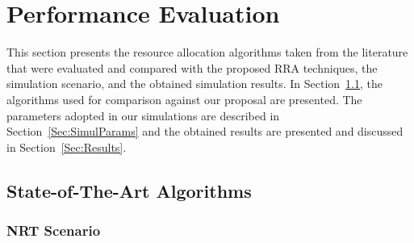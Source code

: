 \documentclass[conference]{IEEEtran}
\newcommand{\FigRef}[1]{Figure~\ref{#1}}
\newcommand{\SecRef}[1]{Section~\ref{#1}}
\begin{document}
%

\section{Performance Evaluation}
\label{sec:Performance}

This section presents the resource allocation algorithms taken from the literature that were evaluated and compared with the proposed \ac{RRA} techniques, the simulation scenario, and the obtained simulation results. In \SecRef{Sec:stateOfTheArtAlg}, the algorithms used for comparison against our proposal are presented. The parameters adopted in our simulations are described in \SecRef{Sec:SimulParams} and the obtained results are presented and discussed in \SecRef{Sec:Results}.

\subsection{State-of-The-Art Algorithms}
\label{Sec:stateOfTheArtAlg}

\subsubsection{NRT Scenario}
\label{PerfNRT}
\end{document}
